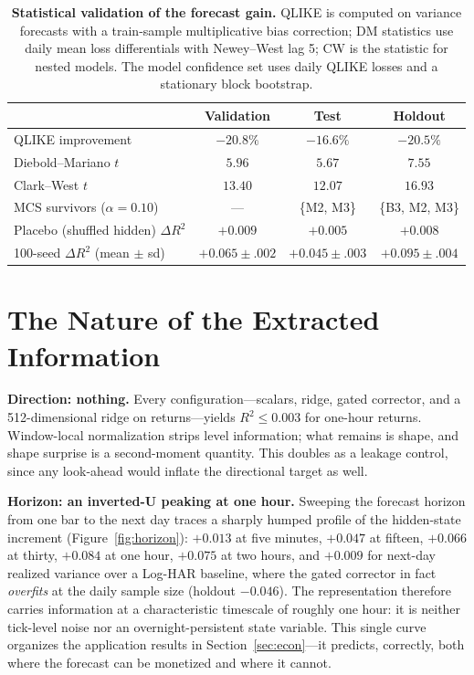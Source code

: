 \documentclass[12pt]{article}
\newcommand{\dR}{\Delta R^2}
\begin{document}
\begin{table}[t]
\centering\small
\caption{\textbf{Statistical validation of the forecast gain.} QLIKE is
computed on variance forecasts with a train-sample multiplicative bias
correction; DM statistics use daily mean loss differentials with Newey--West
lag 5; CW is the \citet{clark2007cw} statistic for nested models. The model
confidence set uses daily QLIKE losses and a stationary block bootstrap.}
\label{tab:stats}
\vspace{6pt}
\begin{tabular}{lccc}
\toprule
 & Validation & Test & Holdout \\
\midrule
QLIKE improvement & $-20.8\%$ & $-16.6\%$ & $\mathbf{-20.5\%}$ \\
Diebold--Mariano $t$ & $5.96$ & $5.67$ & $7.55$ \\
Clark--West $t$ & $13.40$ & $12.07$ & $\mathbf{16.93}$ \\
MCS survivors ($\alpha=0.10$) & --- & \{M2, M3\} & \{B3, M2, M3\} \\
Placebo (shuffled hidden) $\dR$ & $+0.009$ & $+0.005$ & $+0.008$ \\
100-seed $\dR$ (mean $\pm$ sd) & $+0.065\pm.002$ & $+0.045\pm.003$
 & $\mathbf{+0.095\pm.004}$ \\
\bottomrule
\end{tabular}
\end{table}


\section{The Nature of the Extracted Information}\label{sec:nature}
\textbf{Direction: nothing.} Every configuration---scalars, ridge, gated
corrector, and a 512-dimensional ridge on returns---yields $R^2 \le 0.003$ for
one-hour returns. Window-local normalization strips level information; what
remains is shape, and shape surprise is a second-moment quantity. This doubles
as a leakage control, since any look-ahead would inflate the directional
target as well.

\textbf{Horizon: an inverted-U peaking at one hour.} Sweeping the forecast
horizon from one bar to the next day traces a sharply humped profile of the
hidden-state increment (Figure~\ref{fig:horizon}): $+0.013$ at five minutes,
$+0.047$ at fifteen, $+0.066$ at thirty, $+0.084$ at one hour, $+0.075$ at two
hours, and $+0.009$ for next-day realized variance over a Log-HAR baseline,
where the gated corrector in fact \emph{overfits} at the daily sample size
(holdout $-0.046$). The representation therefore carries information at a
characteristic timescale of roughly one hour: it is neither tick-level noise
nor an overnight-persistent state variable. This single curve organizes the
application results in Section~\ref{sec:econ}---it predicts, correctly, both
where the forecast can be monetized and where it cannot.
\end{document}
